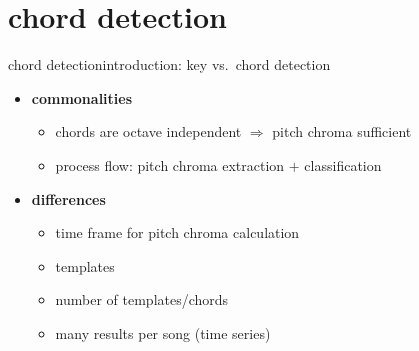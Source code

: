     \section{chord detection}
        \begin{frame}{chord detection}{introduction: key vs.\ chord detection}

            \begin{itemize}
                \item	\textbf{commonalities}
                    \begin{itemize}
                        \item<1->	chords are octave independent $\Rightarrow$ pitch chroma sufficient
                        \item<1->	process flow: pitch chroma extraction $+$ classification
                    \end{itemize}
                \bigskip
                \item<2->	\textbf{differences}
                    \begin{itemize}
                        \item	time frame for pitch chroma calculation
                        \item	templates
                        \item	number of templates/chords
                        \item	many results per song (time series)
                    \end{itemize}
            \end{itemize}
        \end{frame}

